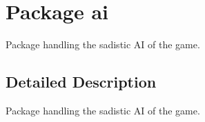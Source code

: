 \hypertarget{namespaceai}{\section{Package ai}
\label{namespaceai}
}


Package handling the sadistic A\-I of the game.  




\subsection{Detailed Description}
Package handling the sadistic A\-I of the game. 